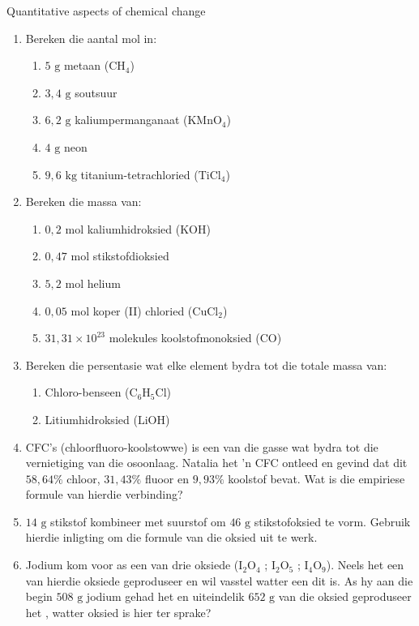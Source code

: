 \begin{eocexercises}{Quantitative aspects of chemical change}
\begin{enumerate}[noitemsep, label=\textbf{\arabic*}. ]
\item Bereken die aantal mol in:
 \begin{enumerate}[noitemsep, label=\textbf{\alph*}. ] 
 \item $5 \text{ g}$ metaan (${\text{CH}}_{4}$)
 \item $3,4 \text{ g}$ soutsuur
\item $6,2 \text{ g}$ kaliumpermanganaat (${\text{KMnO}}_{4}$)
 \item $4 \text{ g}$ neon
 \item $9,6 \text{ kg}$ titanium-tetrachloried (${\text{TiCl}}_{4}$)
 \end{enumerate}
\item Bereken die massa van:
 \begin{enumerate}[noitemsep, label=\textbf{\alph*}. ] 
 \item $0,2 \text{ mol}$ kaliumhidroksied ($\text{KOH}$)
 \item $0,47 \text{ mol}$ stikstofdioksied
 \item $5,2 \text{ mol}$ helium
 \item $0,05 \text{ mol}$ koper (II) chloried (${\text{CuCl}}_{2}$)
 \item $31,31 \times {10}^{23}$ molekules koolstofmonoksied ($\text{CO}$)\end{enumerate}
\item Bereken die persentasie wat elke element bydra tot die totale massa van:
 \begin{enumerate}[noitemsep, label=\textbf{\alph*}. ] 
 \item Chloro-benseen (${\text{C}}_{6}{\text{H}}_{5}\text{Cl}$)
 \item Litiumhidroksied ($\text{LiOH}$)
 \end{enumerate}
\item CFC's (chloorfluoro-koolstowwe) is een van die gasse wat bydra tot die vernietiging van die osoonlaag. Natalia het   'n CFC ontleed en gevind dat dit $58,64\%$ chloor, $31,43\%$ fluoor en $9,93\%$ koolstof bevat. Wat is die empiriese formule van hierdie verbinding?
\item $14 \text{ g}$ stikstof kombineer met suurstof om $46 \text{ g}$ stikstofoksied te vorm. Gebruik hierdie inligting om die formule van die oksied uit te werk.
\item Jodium kom voor as een van drie oksiede (${\text{I}}_{2}{\text{O}}_{4}$ ; ${\text{I}}_{2}{\text{O}}_{5}$ ; ${\text{I}}_{4}{\text{O}}_{9}$). Neels het een van hierdie oksiede geproduseer en wil vasstel watter een dit is. As hy aan die begin $508 \text{ g}$ jodium gehad het en uiteindelik $652 \text{ g}$ van die oksied geproduseer het , watter oksied is hier ter sprake?

\end{enumerate}
\end{eocexercises}
